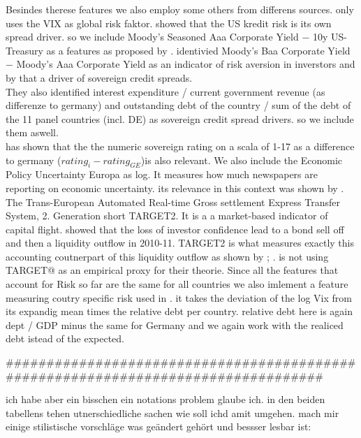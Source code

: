 Besindes therese features we also employ some others from differens sources. \parencite[ECB WP 1781]{afonso2015} only uses the VIX as global risk faktor. \parencite{codogno2003yield} showed that the US kredit risk is its own spread driver. so we include Moody's Seasoned Aaa Corporate Yield  − 10y US-Treasury as a features as proposed by \parencite{codogno2003yield}. \parencite{bernoth2004sovereign} identivied Moody's Baa Corporate Yield − Moody's Aaa Corporate Yield as an indicator of risk aversion in inverstors and by that a driver of sovereign credit spreads. \\
They also identified interest expenditure / current government revenue (as differenze to germany) and outstanding debt of the country / sum of the debt of the 11 panel countries (incl. DE) as sovereign credit spread drivers. so we include them aswell. \\
\textcite{afonso2012sovereign} has shown that the the numeric sovereign rating on a scala of 1-17 as a difference to germany ($rating_i − rating_{GE}$)is also relevant. We also include the Economic Policy Uncertainty Europa as log. It measures how much newspapers are reporting on economic uncertainty. its relevance in this context was shown by \textcite{baker2016measuring}. The Trans-European Automated Real-time Gross settlement Express Transfer System, 2. Generation short TARGET2. It is a a market-based indicator of
capital flight. \textcite{degrauwe2013self} showed that the loss of investor confidence lead to a bond sell off and then a liquidity outflow in 2010-11. TARGET2 is what measures exactly this accounting coutnerpart of this liquidity outflow as shown by \textcite{sinnwollmershaeuser2012}; \textcite{krishnamurthy2018}. \textcite{degrauweji2013} is not using TARGET@ as an empirical proxy for their theorie. Since all the features that account for Risk so far are the same for all countries we also imlement a feature measuring coutry specific risk used in \cite{afonso2015}. it takes the deviation of the log Vix from its expandig mean times the relative debt per country. relative debt here is again dept / GDP minus the same for Germany and we again work with the realiced debt istead of the expected.

##################################################################################

ich habe aber ein bisschen ein notations problem glaube ich. in den beiden tabellens tehen utnerschiedliche sachen wie soll ichd amit umgehen. mach mir einige stilistische vorschläge was geändert gehört und bessser lesbar ist:

